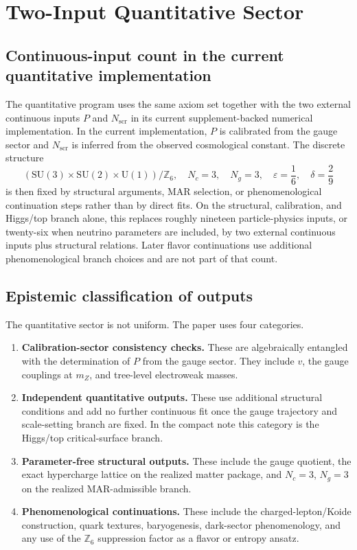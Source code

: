 \documentclass[11pt]{article}
\newcommand{\SU}{\mathrm{SU}}
\newcommand{\U}{\mathrm{U}}
\begin{document}
\section{Two-Input Quantitative Sector}

\subsection{Continuous-input count in the current quantitative implementation}

The quantitative program uses the same axiom set together with the two external continuous inputs $P$ and $N_{\mathrm{scr}}$ in its current supplement-backed numerical implementation. In the current implementation, $P$ is calibrated from the gauge sector and $N_{\mathrm{scr}}$ is inferred from the observed cosmological constant. The discrete structure
\[
(\SU(3)\times\SU(2)\times\U(1))/\mathbb Z_6,\quad
N_c=3,\quad
N_g=3,\quad
\varepsilon=\frac16,\quad
\delta=\frac29
\]
is then fixed by structural arguments, MAR selection, or phenomenological continuation steps rather than by direct fits. On the structural, calibration, and Higgs/top branch alone, this replaces roughly nineteen particle-physics inputs, or twenty-six when neutrino parameters are included, by two external continuous inputs plus structural relations. Later flavor continuations use additional phenomenological branch choices and are not part of that count.

\subsection{Epistemic classification of outputs}

The quantitative sector is not uniform. The paper uses four categories.

\begin{enumerate}[leftmargin=2em]
\item \textbf{Calibration-sector consistency checks.} These are algebraically entangled with the determination of $P$ from the gauge sector. They include $v$, the gauge couplings at $m_Z$, and tree-level electroweak masses.
\item \textbf{Independent quantitative outputs.} These use additional structural conditions and add no further continuous fit once the gauge trajectory and scale-setting branch are fixed. In the compact note this category is the Higgs/top critical-surface branch.
\item \textbf{Parameter-free structural outputs.} These include the gauge quotient, the exact hypercharge lattice on the realized matter package, and $N_c=3$, $N_g=3$ on the realized MAR-admissible branch.
\item \textbf{Phenomenological continuations.} These include the charged-lepton/Koide construction, quark textures, baryogenesis, dark-sector phenomenology, and any use of the $\mathbb Z_6$ suppression factor as a flavor or entropy ansatz.
\end{enumerate}
\end{document}
